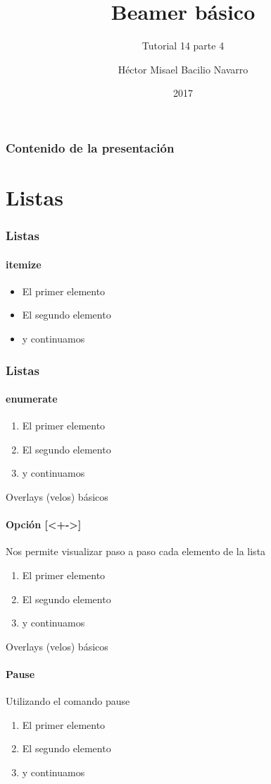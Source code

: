\documentclass{beamer}
\title[Beamer]{\bf\Huge Beamer básico}
\subtitle{Tutorial 14 parte 4}
\author[Héctor Misael Bacilio Navarro]{Héctor Misael Bacilio Navarro}
\institute[]{Universidad de Guadalajara}
\date[2017]{\scriptsize{2017}}
\begin{document}
\begin{frame}
\titlepage
\end{frame}

\begin{frame}
\frametitle{Contenido de la presentación}
\tableofcontents
\end{frame}

\section{Listas}

\begin{frame}
\frametitle{Listas}
\framesubtitle{itemize}

\begin{itemize}
\item El primer elemento
\item El segundo elemento
\item y continuamos
\end{itemize}

\end{frame}


\begin{frame}
\frametitle{Listas}
\framesubtitle{enumerate}

\begin{enumerate}
\item El primer elemento
\item El segundo elemento
\item y continuamos
\end{enumerate}

\end{frame}

\begin{frame}{Overlays (velos) básicos}
\framesubtitle{Opción [<+->]}
Nos permite visualizar paso a paso cada elemento de la lista
\begin{enumerate}[<+->]
\item El primer elemento
\item El segundo elemento
\item y continuamos
\end{enumerate}
\end{frame}

\begin{frame}{Overlays (velos) básicos}
\framesubtitle{Pause}
Utilizando el comando pause
\begin{enumerate}
\item El primer elemento 
\item El segundo elemento \pause
\item y continuamos
\end{enumerate}
\end{frame}
\end{document}
